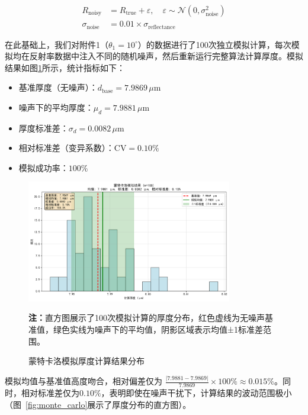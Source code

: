 \documentclass[withoutpreface,bwprint]{cumcmthesis} %
\begin{document}
\begin{align}
    R_{\text{noisy}}      & = R_{\text{true}} + \varepsilon, \quad \varepsilon \sim \mathcal{N}(0, \sigma_{\text{noise}}^2) \\
    \sigma_{\text{noise}} & = 0.01 \times \sigma_{\text{reflectance}}
\end{align}

在此基础上，我们对附件1（$\theta_1 = 10^\circ$）的数据进行了100次独立模拟计算，每次模拟均在反射率数据中注入不同的随机噪声，然后重新运行完整算法计算厚度。模拟结果如图\ref{fig:monte-carlo}所示，统计指标如下：

\newcommand{\baseThickness}{7.9869}
\newcommand{\meanThickness}{7.9881}
\newcommand{\stdThickness}{0.0082}
\newcommand{\relativeStd}{0.10}

\begin{itemize}
    \item 基准厚度（无噪声）：$d_{\text{base}} = \baseThickness \, \mu\text{m}$
    \item 噪声下的平均厚度：$\mu_d = \meanThickness \, \mu\text{m}$
    \item 厚度标准差：$\sigma_d = \stdThickness \, \mu\text{m}$
    \item 相对标准差（变异系数）：$\text{CV} = \relativeStd\%$
    \item 模拟成功率：$100\%$
\end{itemize}

\begin{figure}[!h]
    \centering
    \includegraphics[width=0.8\textwidth]{figures/monte_carlo_result.png}
    \caption{蒙特卡洛模拟厚度计算结果分布}
    \label{fig:monte-carlo}
    \textbf{注：}直方图展示了100次模拟计算的厚度分布，红色虚线为无噪声基准值，绿色实线为噪声下的平均值，阴影区域表示均值±1标准差范围。
\end{figure}

模拟均值与基准值高度吻合，相对偏差仅为 $\frac{|{7.9881} - {7.9869}|}{{7.9869}} \times 100\% \approx {0.015}\%$。同时，相对标准差仅为$0.10\%$，表明即使在噪声干扰下，计算结果的波动范围极小（图~\ref{fig:monte_carlo}展示了厚度分布的直方图）。
\end{document}
